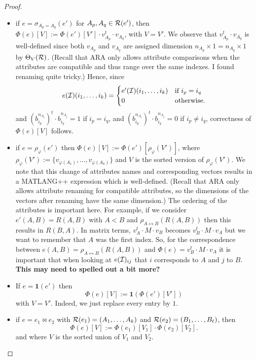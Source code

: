 \begin{proof}
\begin{itemize}
\item if $e=\sigma_{A_p=A_q}(e')$ for $A_p,A_q\in\mathcal{R}(e')$, then 
$
\Phi(e)[V]:=\Phi(e')[V']\cdot v_{A_p}^t\cdot v_{A_q}
$,
with $V=V'$. We observe that $v_{A_p}^t\cdot v_{A_q}$ is well-defined since both $v_{A_p}$ and $v_{A_q}$ are assigned dimension $n_{A_p}\times 1=n_{A_q}\times 1$ by $\Theta_V(\mathcal{R})$. (Recall that ARA only allows attribute comparisons when the attributes are compatible and thus range over the same indexes. I found renaming quite tricky.)
Hence, since  
$$
e(\mathcal{I})(i_1,\ldots,i_k)=\begin{cases}
e'(\mathcal{I})(i_1,\ldots,i_k) & \text{if $i_p=i_q$}\\
0 & \text{otherwise}.
\end{cases}
$$
and $(b_{i_p}^{n_{A_i}})^t\cdot b_{i_q}^{n_{A_j}}=1$ if $i_p=i_q$, and  $(b_{i_p}^{n_{A_i}})^t\cdot b_{i_q}^{n_{A_j}}=0$ if $i_p\neq i_q$, correctness of $\Phi(e)[V]$ follows.
\item if $e=\rho_{\varphi}(e')$ then 
$\Phi(e)[V]:=\Phi(e')[\rho_\varphi(V')]$, where $\rho_\varphi(V'):=\{v_{\varphi(A_1)},\ldots,v_{\varphi(A_k)}\}$ and $V$ is the sorted  version of $\rho_\varphi(V')$. We note that this change of attributes names and corresponding vectors results in a MATLANG++ expression which is well-defined. (Recall that ARA only allows attribute renaming for compatible attributes, so the dimensions of the vectors after renaming have the same dimension.) The ordering of the attributes is important here. For example, 
if we consider $e'(A,B)=R(A,B)$ with $A<B$ and $\rho_{A\leftrightarrow B}(R(A,B))$
then this results in $R(B,A)$. In matrix terms, $v_A^t\cdot M\cdot v_B$ becomes 
$v_B^t\cdot M\cdot v_A$ but we want to remember that $A$ was the first index. So, for the correspondence between $e(A,B)=\rho_{A\leftrightarrow B}(R(A,B))$  and 
$\Phi(e)=v_B^t\cdot M\cdot v_A$ it is important that when looking at $e(\mathcal{I})_{ij}$ that $i$ corresponds to $A$ and $j$ to $B$. {\bf This may need to spelled out a bit more?}
\item If $e=\mathbf{1}(e')$  then 
$$
\Phi(e)[V]:=\mathbf{1}(\Phi(e')[V'])
$$
with $V=V'$. Indeed, we just replace every entry  by $1$.
\item if $e=e_1\bowtie e_2$ with $\mathcal{R}(e_1)=(A_1,\ldots, A_k)$ and $\mathcal{R}(e_2)=(B_1,\ldots,B_\ell)$, then
$$
\Phi(e)[V]:=\Phi(e_1)[V_1]\cdot \Phi(e_2)[V_2].
$$
and where $V$ is the sorted union of $V_1$ and $V_2$.
\end{itemize}
\end{proof}

